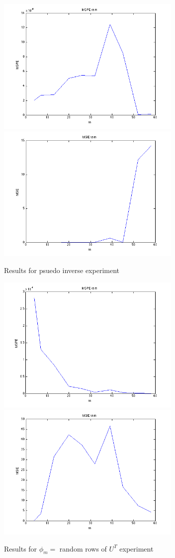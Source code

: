 \documentclass[11pt]{article}
\begin{document}
\begin{enumerate}
\begin{itemize}
		\begin{figure}[h]
			\centering
			\includegraphics[width=3.5in]{hw5_2_11.png}
			\includegraphics[width=3.5in]{hw5_2_12.png}
			\caption{Results for psuedo inverse experiment}
		\end{figure}
		
		\begin{figure}[h]
			\centering
			\includegraphics[width=3.5in]{hw5_3_11.png}
			\includegraphics[width=3.5in]{hw5_3_12.png}
			\caption{Results for $\phi_m = $ random rows of $U^T$ experiment}
		\end{figure}
\end{itemize}

\end{enumerate}
\end{document}
